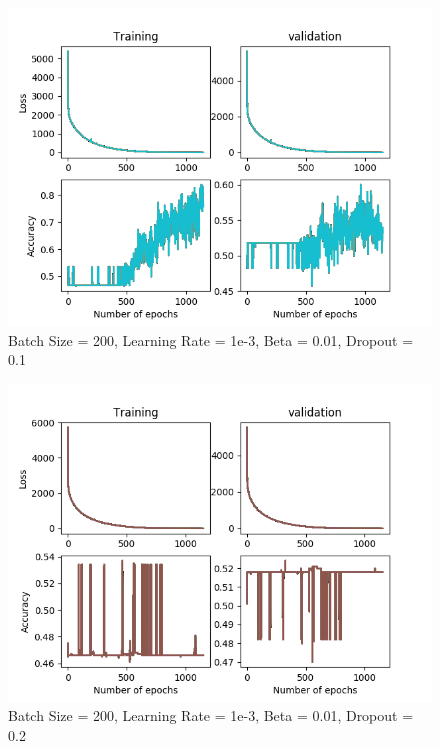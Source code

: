 \documentclass[12pt,reqno]{amsart}
\numberwithin{equation}{section}
\begin{document}
\begin{enumerate}
\begin{figure}[H]
\centering
\includegraphics[scale=0.6]{data12-1e-3-200-1e-2-1e-1}
\caption{Batch Size = 200, Learning Rate = 1e-3, Beta = 0.01, Dropout = 0.1}
\end{figure}

\begin{figure}[H]
\centering
\includegraphics[scale=0.6]{data12-1e-3-200-1e-2-2e-1}
\caption{Batch Size = 200, Learning Rate = 1e-3, Beta = 0.01, Dropout = 0.2}
\end{figure}


\end{enumerate}
\end{document}
